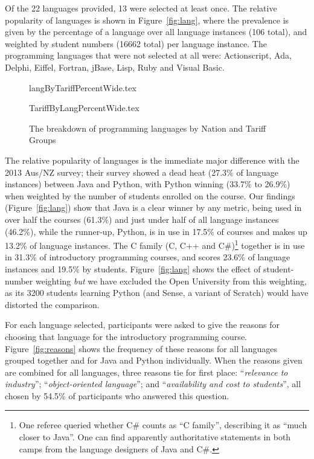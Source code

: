 \documentclass[english,submission]{programming}
\begin{document}
Of the 22 languages provided, 13 were selected at least once. The
relative popularity of languages is shown in Figure~\ref{fig:lang},
where the prevalence is given by the percentage of a language over all
language instances (106 total), and weighted by student numbers (16662
total) per language instance. The programming languages that were not
selected at all were: Actionscript, Ada, Delphi, Eiffel, Fortran,
jBase, Lisp, Ruby and Visual Basic.

\begin{figure}
\begin{center}
{langByTariffPercentWide.tex}
\end{center}%
%
\begin{center}
{TariffByLangPercentWide.tex}
\end{center}
\caption{The breakdown of programming languages by Nation and Tariff Groups\label{fig;LangTariff}}
\end{figure}

The relative popularity of languages is the immediate major difference
with the 2013 Aus/NZ survey; their survey showed a dead heat (27.3\%
of language instances) between Java and Python, with Python winning
(33.7\% to 26.9\%) when weighted by the number of students enrolled on
the course.  Our findings (Figure~\ref{fig:lang}) show that Java is a
clear winner by any metric, being used in over half the courses
(61.3\%) and just under half of all language instances (46.2\%), while
the runner-up, Python, is in use in 17.5\% of courses and makes up
13.2\% of language instances. The C family (C, C++ and C\#)\footnote{One referee queried whether C\# counts as ``C family'', describing it as ``much closer to Java''. One can find apparently authoritative statements in both camps from the language designers of Java and C\#.} together
is in use in 31.3\% of introductory programming courses, and scores
23.6\% of language instances and 19.5\% by
students. Figure~\ref{fig:lang} shows the effect of student-number
weighting \emph{but} we have excluded the Open University from this
weighting, as its 3200 students learning Python (and Sense, a variant
of Scratch) would have distorted the comparison.

For each language selected, participants were asked to give the
reasons for choosing that language for the introductory programming
course. Figure~\ref{fig:reasons} shows the frequency of these reasons
for all languages grouped together and for Java and Python
individually. When the reasons given are combined for all languages,
three reasons tie for first place: ``{\emph{relevance to industry}}'';
``{\emph{object-oriented language}}''; and ``{\emph{availability and
cost to students}}'', all chosen by 54.5\% of participants who
answered this question.
\end{document}
